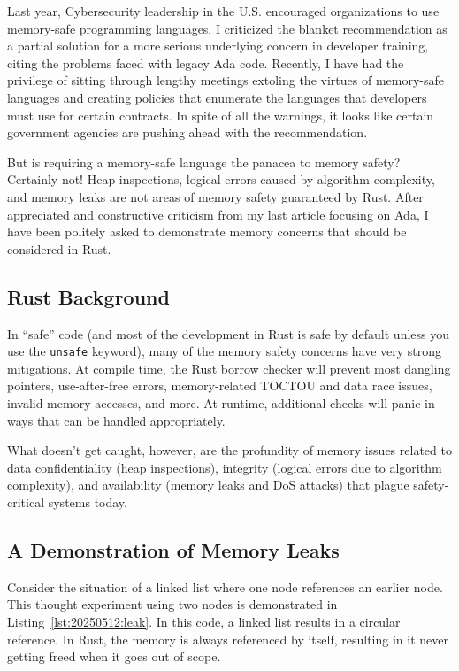 Last year, Cybersecurity leadership in the U.S. encouraged organizations to use memory-safe programming languages. I criticized the blanket recommendation\autocite{20250512:hood2} as a partial solution for a more serious underlying concern in developer training, citing the problems faced with legacy Ada code\autocites{20250512:hood}{20250512:keen}. Recently, I have had the privilege of sitting through lengthy meetings extoling the virtues of memory-safe languages and creating policies that enumerate the languages that developers must use for certain contracts. In spite of all the warnings, it looks like certain government agencies are pushing ahead with the recommendation.

But is requiring a memory-safe language the panacea to memory safety? Certainly not! Heap inspections, logical errors caused by algorithm complexity, and memory leaks are not areas of memory safety guaranteed by Rust. After appreciated and constructive criticism from my last article focusing on Ada, I have been politely asked to demonstrate memory concerns that should be considered in Rust.

\subsection*{Rust Background}
In ``safe'' code (and most of the development in Rust is safe by default unless you use the \texttt{unsafe} keyword), many of the memory safety concerns have very strong mitigations. At compile time, the Rust borrow checker will prevent most dangling pointers, use-after-free errors, memory-related TOCTOU and data race issues, invalid memory accesses, and more. At runtime, additional checks will panic in ways that can be handled appropriately.

What doesn't get caught, however, are the profundity of memory issues related to data confidentiality (heap inspections), integrity (logical errors due to algorithm complexity), and availability (memory leaks and DoS attacks) that plague safety-critical systems today.

\subsection*{A Demonstration of Memory Leaks}

Consider the situation of a linked list where one node references an earlier node. This thought experiment using two nodes is demonstrated in Listing~\ref{lst:20250512:leak}. In this code, a linked list results in a circular reference. In Rust, the memory is always referenced by itself, resulting in it never getting freed when it goes out of scope.

